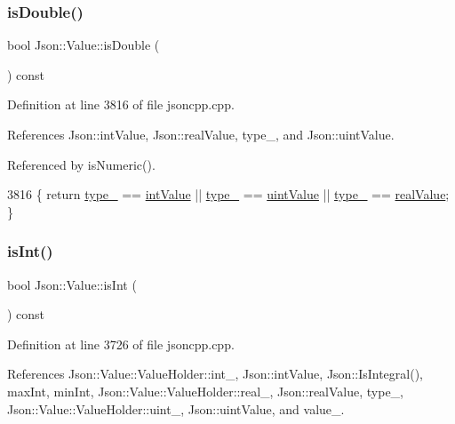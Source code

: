 \subsubsection{\texorpdfstring{is\+Double()}{isDouble()}}
{\footnotesize\ttfamily bool Json\+::\+Value\+::is\+Double (\begin{DoxyParamCaption}{ }\end{DoxyParamCaption}) const}



Definition at line 3816 of file jsoncpp.\+cpp.



References Json\+::int\+Value, Json\+::real\+Value, type\+\_\+, and Json\+::uint\+Value.



Referenced by is\+Numeric().


\begin{DoxyCode}
3816 \{ \textcolor{keywordflow}{return} \hyperlink{class_json_1_1_value_abd222c2536dc88bf330dedcd076d2356}{type\_} == \hyperlink{namespace_json_a7d654b75c16a57007925868e38212b4eae5a9d708d5c9e23ae9bf98898522512d}{intValue} || \hyperlink{class_json_1_1_value_abd222c2536dc88bf330dedcd076d2356}{type\_} == \hyperlink{namespace_json_a7d654b75c16a57007925868e38212b4eaea788d9a3bb00adc6d68d97d43e1ccd3}{uintValue} || 
      \hyperlink{class_json_1_1_value_abd222c2536dc88bf330dedcd076d2356}{type\_} == \hyperlink{namespace_json_a7d654b75c16a57007925868e38212b4eab837c7b869c14d8be712deb45c9e490e}{realValue}; \}
\end{DoxyCode}
\mbox{\label{class_json_1_1_value_aff51d8b52979ca06cf9d909accd5f695}} 
\subsubsection{\texorpdfstring{is\+Int()}{isInt()}}
{\footnotesize\ttfamily bool Json\+::\+Value\+::is\+Int (\begin{DoxyParamCaption}{ }\end{DoxyParamCaption}) const}



Definition at line 3726 of file jsoncpp.\+cpp.



References Json\+::\+Value\+::\+Value\+Holder\+::int\+\_\+, Json\+::int\+Value, Json\+::\+Is\+Integral(), max\+Int, min\+Int, Json\+::\+Value\+::\+Value\+Holder\+::real\+\_\+, Json\+::real\+Value, type\+\_\+, Json\+::\+Value\+::\+Value\+Holder\+::uint\+\_\+, Json\+::uint\+Value, and value\+\_\+.



